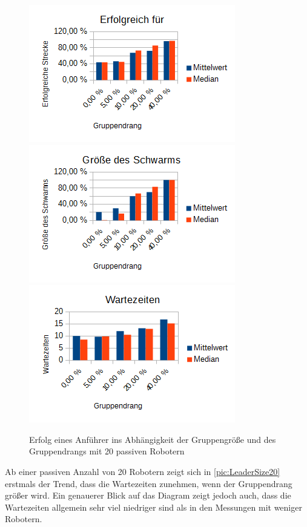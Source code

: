 \begin{figure}[h]
	\includegraphics[width=\sectionLeaderPictureWidth , height=\sectionLeaderPictureHeight]{graphics/Statistics/Leader/FlockSize/20_1.png}
	\includegraphics[width=\sectionLeaderPictureWidth , height=\sectionLeaderPictureHeight]{graphics/Statistics/Leader/FlockSize/20_2.png}
	\includegraphics[width=\sectionLeaderPictureWidth , height=\sectionLeaderPictureHeight]{graphics/Statistics/Leader/FlockSize/20_3.png}
	\caption{Erfolg eines Anführer ins Abhängigkeit der Gruppengröße und des Gruppendrangs mit 20 passiven Robotern}
	\label{pic:LeaderSize20}
\end{figure}

Ab einer passiven Anzahl von 20 Robotern zeigt sich in \autoref{pic:LeaderSize20} erstmals der Trend, dass die Wartezeiten zunehmen, wenn der Gruppendrang größer wird. Ein genauerer Blick auf das Diagram zeigt jedoch auch, dass die Wartezeiten allgemein sehr viel niedriger sind als in den Messungen mit weniger Robotern.

